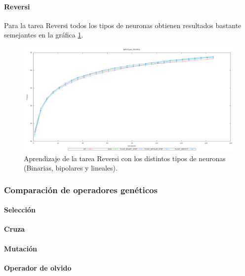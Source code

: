 \documentclass[11pt]{article}
\begin{document}
\begin{titlepage}
\newpage
\paragraph{Reversi}
\label{sec-6-2-2-4}


Para la tarea Reversi todos los tipos de neuronas obtienen resultados bastante semejantes en la gráfica \ref{aprenDiscretReversi}.

\begin{figure}[htb]
\centering
\includegraphics[width=\textwidth]{./img/BufferTypes_REVERSI.png}
\caption{\label{aprenDiscretReversi}Aprendizaje de la tarea Reversi con los distintos tipos de neuronas (Binarias, bipolares y lineales).}
\end{figure}

\newpage
\subsubsection{Comparaci\'on de operadores gen\'eticos}
\label{sec-6-2-3}

   \label{}
\paragraph{Selección}
\label{sec-6-2-3-1}


\newpage
\paragraph{Cruza}
\label{sec-6-2-3-2}


\newpage
\paragraph{Mutación}
\label{sec-6-2-3-3}


\newpage
\paragraph{Operador de olvido}
\label{sec-6-2-3-4}



\end{titlepage}
\end{document}
